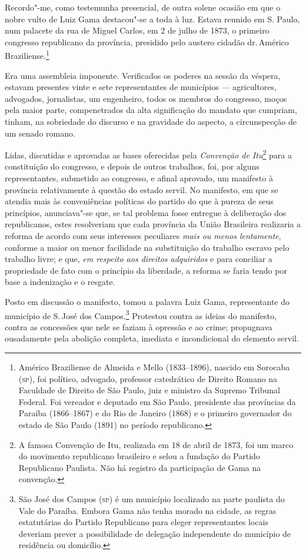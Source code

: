 Recordo"-me, como testemunha presencial, de outra solene ocasião em que o
nobre vulto de Luiz Gama destacou"-se a toda à luz. Estava reunido em S.
Paulo, num palacete da rua de Miguel Carlos, em 2 de julho de 1873, o
primeiro congresso republicano da província, presidido pelo austero
cidadão dr.\,Américo Braziliense.\footnote{Américo Braziliense de
  Almeida e Mello (1833--1896), nascido em Sorocaba (\textsc{sp}), foi político,
  advogado, professor catedrático de Direito Romano na Faculdade de
  Direito de São Paulo, juiz e ministro da Supremo Tribunal Federal. Foi
  vereador e deputado em São Paulo, presidente das províncias da Paraíba
  (1866--1867) e do Rio de Janeiro (1868) e o primeiro governador do
  estado de São Paulo (1891) no período republicano.}

Era uma assembleia imponente. Verificados os poderes na sessão da
véspera, estavam presentes vinte e sete representantes de municípios
--- agricultores, advogados, jornalistas, um engenheiro, todos os
membros do congresso, moços pela maior parte, compenetrados da alta
significação do mandato que cumpriam, tinham, na sobriedade do discurso
e na gravidade do aspecto, a circunspecção de um senado romano.

Lidas, discutidas e aprovadas as bases oferecidas pela \emph{Convenção
de Itu}\footnote{A famosa Convenção de Itu, realizada em 18 de abril
  de 1873, foi um marco do movimento republicano brasileiro e selou a
  fundação do Partido Republicano Paulista. Não há registro da
  participação de Gama na convenção.} para a constituição do congresso,
e depois de outros trabalhos, foi, por alguns representantes, submetido
ao congresso, e afinal aprovado, um manifesto à província relativamente
à questão do estado servil. No manifesto, em que se atendia mais às
conveniências políticas do partido do que à pureza de seus princípios,
anunciava"-se que, se tal problema fosse entregue à deliberação dos
republicanos, estes resolveriam que cada província da União Brasileira
realizaria a reforma de acordo com seus interesses peculiares \emph{mais
ou menos lentamente}, conforme a maior ou menor facilidade na
substituição do trabalho escravo pelo trabalho livre; e que, \emph{em
respeito aos direitos adquiridos} e para conciliar a propriedade de fato
com o princípio da liberdade, a reforma se faria tendo por base a
indenização e o resgate.

Posto em discussão o manifesto, tomou a palavra Luiz Gama, representante
do município de S.\,José dos Campos.\footnote{São José dos Campos (\textsc{sp})
  é um município localizado na parte paulista do Vale do Paraíba. Embora
  Gama não tenha morado na cidade, as regras estatutárias do Partido
  Republicano para eleger representantes locais deveriam prever a
  possibilidade de delegação independente do município de residência ou
  domicílio.} Protestou contra as ideias do manifesto, contra as
concessões que nele se faziam à opressão e ao crime; propugnava
ousadamente pela abolição completa, imediata e incondicional do elemento
servil.

